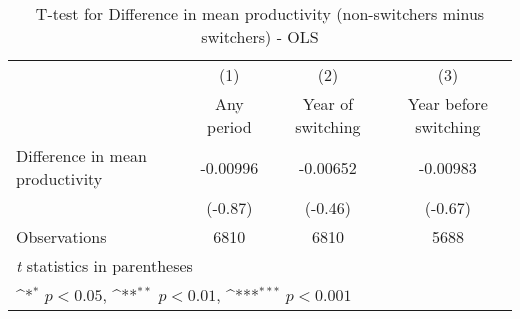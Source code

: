 \begin{table}[htbp]\centering
\def\sym#1{\ifmmode^{#1}\else\(^{#1}\)\fi}
\caption{T-test for Difference in mean productivity (non-switchers minus switchers) - OLS}
\begin{tabular}{l*{3}{c}}
\hline\hline
                    &\multicolumn{1}{c}{(1)}&\multicolumn{1}{c}{(2)}&\multicolumn{1}{c}{(3)}\\
                    &\multicolumn{1}{c}{Any period}&\multicolumn{1}{c}{Year of switching}&\multicolumn{1}{c}{Year before switching}\\
\hline
Difference in mean productivity&    -0.00996         &    -0.00652         &    -0.00983         \\
                    &     (-0.87)         &     (-0.46)         &     (-0.67)         \\
\hline
Observations        &        6810         &        6810         &        5688         \\
\hline\hline
\multicolumn{4}{l}{\footnotesize \textit{t} statistics in parentheses}\\
\multicolumn{4}{l}{\footnotesize \sym{*} \(p<0.05\), \sym{**} \(p<0.01\), \sym{***} \(p<0.001\)}\\
\end{tabular}
\end{table}
